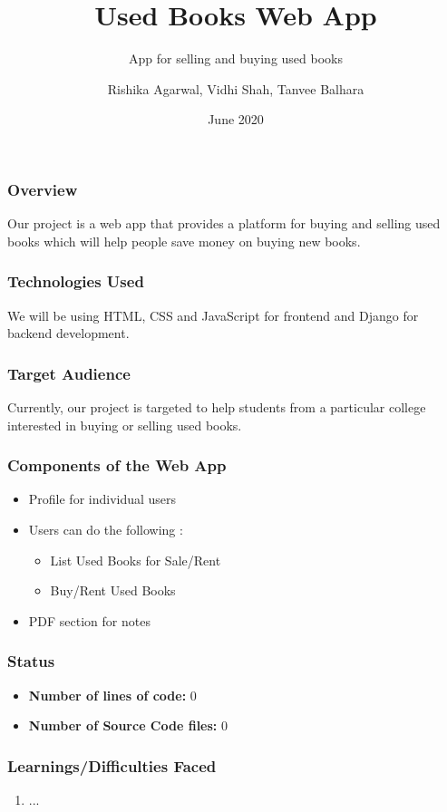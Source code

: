 \documentclass[14pt]{beamer}
\title[USED BOOKS]{Used Books Web App}
\subtitle{App for selling and buying used books}
\author[Team 14]{Rishika Agarwal, Vidhi Shah, Tanvee Balhara}
\date{June 2020}
\begin{document}
\begin{frame}
    \titlepage
\end{frame}

\begin{frame}
    \frametitle{Overview}
    Our project is a web app that provides a platform for buying and selling used books which will help people save money on buying new books.
\end{frame}

\begin{frame}
    \frametitle{Technologies Used}
    We will be using HTML, CSS and JavaScript for frontend and Django for backend development.
\end{frame}

\begin{frame}
    \frametitle{Target Audience}
    Currently, our project is targeted to help students from a particular college interested in buying or selling used books.
\end{frame}

\begin{frame}
    \frametitle{Components of the Web App}
    \begin{itemize}
        \item  Profile for individual users
        \item  Users can do the following :
            \begin{itemize}
                \item  List Used Books for Sale/Rent
                \item  Buy/Rent Used Books
            \end{itemize}
    \item  PDF section for notes
    \end{itemize}
\end{frame}

\begin{frame}
    \frametitle{Status}
    \begin{itemize}
        \item \textbf{Number of lines of code: } 0
        \item \textbf{Number of Source Code files: } 0
    \end{itemize}
\end{frame}

\begin{frame}
    \frametitle{Learnings/Difficulties Faced}
    \begin{enumerate}
        \item ...
    \end{enumerate}
\end{frame}
\end{document}
